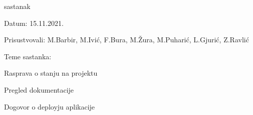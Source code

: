 \begin{packed_enum}
			\item  sastanak
			\item[] \begin{packed_item}
				\item Datum: 15.11.2021.
				\item Prisustvovali: M.Barbir, M.Ivić, F.Bura, M.Žura, M.Puharić, L.Gjurić, Z.Ravlić
				\item Teme sastanka:
				\begin{packed_item}
					\item  Rasprava o stanju na projektu
					\item  Pregled dokumentacije
					\item  Dogovor o deployju aplikacije 
				\end{packed_item}
			\end{packed_item}
		

\end{packed_enum}
